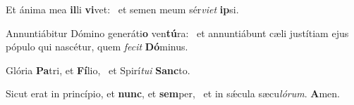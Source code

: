 \item Et ánima mea \textbf{il}li \textbf{vi}vet:~\psstar{} et semen meum sér\textit{viet} \textbf{ip}si.
\item Annuntiábitur Dómino generáti\textbf{o} ven\textbf{tú}ra:~\psstar{} et annuntiábunt cæli justítiam ejus pópulo qui nascétur, quem \textit{fecit} \textbf{Dó}minus.
\item Glória \textbf{Pa}tri, et \textbf{Fí}lio,~\psstar{} et Spirí\textit{tui} \textbf{Sanc}to.
\item Sicut erat in princípio, et \textbf{nunc}, et \textbf{sem}per,~\psstar{} et in sǽcula sæcu\textit{lórum}. \textbf{A}men.

